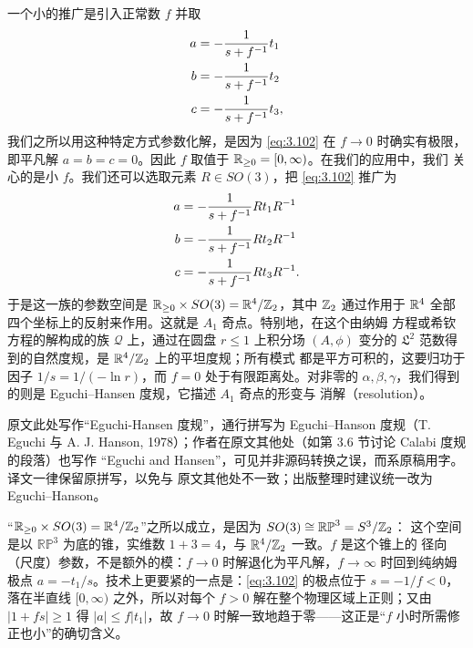 一个小的推广是引入正常数 $f$ 并取
\setcounter{equation}{101}
\begin{equation}\label{eq:3.102}
  \begin{aligned}a&= -{1\over s+f^{-1}}t_1\\
                    b&=-{1\over s+f^{-1}}t_2\\
                    c&=-{1\over s+f^{-1}}t_3,\end{aligned}
\end{equation}
我们之所以用这种特定方式参数化解，是因为 \eqref{eq:3.102} 在 $f\to 0$ 时确实有极限，
即平凡解 $a=b=c=0$。因此 $f$ 取值于 ${\mathbb{R}}_{\geq 0}=[0,\infty)$。在我们的应用中，我们
关心的是小 $f$。我们还可以选取元素 $R\in SO(3)$，把 \eqref{eq:3.102} 推广为
\setcounter{equation}{102}
\begin{equation}\label{eq:3.103}
  \begin{aligned}a&= -{1\over s+f^{-1}}Rt_1R^{-1}\\
                    b&=-{1\over s+f^{-1}}Rt_2R^{-1}\\
                    c&=-{1\over s+f^{-1}}Rt_3R^{-1}.\end{aligned}
\end{equation}
于是这一族的参数空间是 ${\mathbb{R}}_{\geq 0}\times SO(3)={\mathbb{R}}^4/{\mathbb{Z}}_2$，其中 ${\mathbb{Z}}_2$ 通过作用于
${\mathbb{R}}^4$ 全部四个坐标上的反射来作用。这就是 $A_1$ 奇点。特别地，在这个由纳姆
方程或希钦方程的解构成的族 ${\mathcal Q}$ 上，通过在圆盘 $r\leq 1$ 上积分场 $(A,\phi)$
变分的 ${\mathfrak{L}}^2$ 范数得到的自然度规，是 ${\mathbb{R}}^4/{\mathbb{Z}}_2$ 上的平坦度规；所有模式
都是平方可积的，这要归功于因子 $1/s=1/(-\ln r)$，而 $f=0$ 处于有限距离处。对非零的
$\alpha,\beta,\gamma$，我们得到的则是 Eguchi--Hansen 度规，它描述 $A_1$ 奇点的形变与
消解（resolution）。

\begin{yizhu}[原文疑误]
原文此处写作“Eguchi-Hansen 度规”，通行拼写为 Eguchi--Hanson 度规（T. Eguchi 与
A. J. Hanson, 1978）；作者在原文其他处（如第 3.6 节讨论 Calabi 度规的段落）也写作
“Eguchi and Hansen”，可见并非源码转换之误，而系原稿用字。译文一律保留原拼写，以免与
原文其他处不一致；出版整理时建议统一改为 Eguchi--Hanson。
\end{yizhu}

\begin{yizhu}[含糊点拨]
“${\mathbb{R}}_{\geq 0}\times SO(3)={\mathbb{R}}^4/{\mathbb{Z}}_2$”之所以成立，是因为 $SO(3)\cong\mathbb{RP}^3=S^3/{\mathbb{Z}}_2$：
这个空间是以 $\mathbb{RP}^3$ 为底的锥，实维数 $1+3=4$，与 ${\mathbb{R}}^4/{\mathbb{Z}}_2$ 一致。$f$ 是这个锥上的
径向（尺度）参数，不是额外的模：$f\to 0$ 时解退化为平凡解，$f\to\infty$ 时回到纯纳姆极点
$a=-t_1/s$。技术上更要紧的一点是：\eqref{eq:3.102} 的极点位于 $s=-1/f<0$，落在半直线
$[0,\infty)$ 之外，所以对每个 $f>0$ 解在整个物理区域上正则；又由 $|1+fs|\geq 1$ 得
$|a|\leq f|t_1|$，故 $f\to 0$ 时解一致地趋于零——这正是“$f$ 小时所需修正也小”的确切含义。
\end{yizhu}

